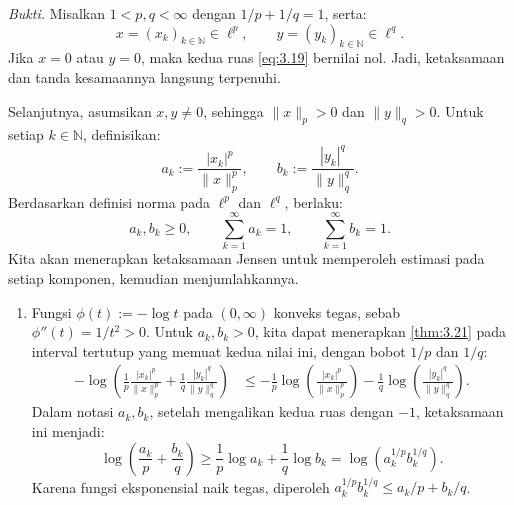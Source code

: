\documentclass[aspectratio=169,11pt]{beamer}
\theoremstyle{definition}
\newcommand{\myref}[1]{\hyperref[#1]{\nameCref{#1} \ref*{#1}}}
\newcommand{\N}{\mathbb{N}}
\begin{document}
\begin{frame}[allowframebreaks=1]{\insertsection}{\insertsubsection}
  \textit{Bukti.}
  Misalkan $1<p,q<\infty$ dengan $1/p+1/q=1$, serta:
  \begin{equation*}
    x=(x_k)_{k\in\N}\in\ell^p, \qquad y=(y_k)_{k\in\N}\in\ell^q.
  \end{equation*}
  Jika $x=0$ atau $y=0$, maka kedua ruas \eqref{eq:3.19} bernilai nol. Jadi, ketaksamaan dan tanda kesamaannya langsung terpenuhi.

  Selanjutnya, asumsikan $x,y\neq 0$, sehingga $\|x\|_p>0$ dan $\|y\|_q>0$. Untuk setiap $k\in\N$, definisikan:
  \begin{equation*}
    a_k := \frac{|x_k|^p}{\|x\|_p^p}, \qquad
    b_k := \frac{|y_k|^q}{\|y\|_q^q}.
  \end{equation*}
  Berdasarkan definisi norma pada $\ell^p$ dan $\ell^q$, berlaku:
  \begin{equation*}
    a_k,b_k\geq 0, \qquad
    \sum_{k=1}^{\infty}a_k=1, \qquad \sum_{k=1}^{\infty}b_k=1.
  \end{equation*}
  Kita akan menerapkan ketaksamaan Jensen untuk memperoleh estimasi pada setiap komponen, kemudian menjumlahkannya.


  \begin{enumerate}
    \item Fungsi $\phi(t):=-\log t$ pada $(0,\infty)$ konveks tegas, sebab $\phi''(t)=1/t^2>0$. Untuk $a_k,b_k>0$, kita dapat menerapkan \myref{thm:3.21} pada interval tertutup yang memuat kedua nilai ini, dengan bobot $1/p$ dan $1/q$:
          \begin{equation}
            \begin{aligned}
              -\log\left(\frac{1}{p}\frac{|x_k|^p}{\|x\|_p^p}
              +\frac{1}{q}\frac{|y_k|^q}{\|y\|_q^q}\right)
               & \leq -\frac{1}{p}\log\left(\frac{|x_k|^p}{\|x\|_p^p}\right)-\frac{1}{q}\log\left(\frac{|y_k|^q}{\|y\|_q^q}\right).
            \end{aligned}\label{eq:3.21}
          \end{equation}
          Dalam notasi $a_k,b_k$, setelah mengalikan kedua ruas dengan $-1$, ketaksamaan ini menjadi:
          \begin{equation*}
            \log\left(\frac{a_k}{p}+\frac{b_k}{q}\right)
            \geq \frac{1}{p}\log a_k+\frac{1}{q}\log b_k
            =\log\left(a_k^{1/p}b_k^{1/q}\right).
          \end{equation*}
          Karena fungsi eksponensial naik tegas, diperoleh $a_k^{1/p}b_k^{1/q}\leq a_k/p+b_k/q$.


\end{enumerate}
\end{frame}
\end{document}
